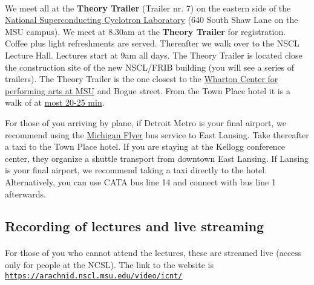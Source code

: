 \documentclass[%
twoside,                 %
final,                   %
10pt]{article}
\begin{document}
\paragraph{}
We meet all at the \textbf{Theory Trailer} (Trailer nr. 7) on the eastern side of the \href{{http://www.nscl.msu.edu/}}{National Superconducting Cyclotron
Laboratory} (640 South Shaw Lane on the MSU campus).  
We meet at 8.30am at the \textbf{Theory Trailer} for registration. Coffee plus light refreshments are served. Thereafter we walk over to the NSCL Lecture Hall. Lectures start at 9am all days.
The Theory Trailer is located close the construction site of the new NSCL/FRIB building (you will see a series of trailers). The Theory Trailer is the one closest to the \href{{http://www.whartoncenter.com}}{Wharton Center for performing arts at MSU} and Bogue street. 
From the Town Place hotel it is a walk of at \href{{https://www.google.com/maps/dir/2855+Hannah+Blvd,+East+Lansing,+MI+48823/640+South+Shaw+Lane,+East+Lansing,+MI/@42.7219308,-84.4747951,15z/data=!3m1!4b1!4m14!4m13!1m5!1m1!1s0x8822c2bce3547475:0xd5a97d9b6a59e537!2m2!1d-84.456337!2d42.718323!1m5!1m1!1s0x8822c2841754be71:0xb0ff5dca5dac1c71!2m2!1d-84.4738287!2d42.7247813!3e2}}{most 20-25 min}.

For those of you arriving by plane, if Detroit Metro is your final airport, we recommend using the \href{{http://www.michiganflyer.com}}{Michigan Flyer} bus service to East Lansing. Take thereafter a taxi to the Town Place hotel. If you are staying at the Kellogg conference center, they organize a shuttle transport from downtown East Lansing. If Lansing is your final airport, we recommend taking a taxi directly to the hotel. Alternatively, you can use CATA bus line 14 and connect with bus line 1 afterwards.



\subsection*{Recording of lectures and live streaming}

\paragraph{}
For those of you who cannot attend the lectures, these are streamed live (access only for people at the NCSL). The link to the website is \href{{https://arachnid.nscl.msu.edu/video/icnt/}}{\nolinkurl{https://arachnid.nscl.msu.edu/video/icnt/}}
\end{document}
